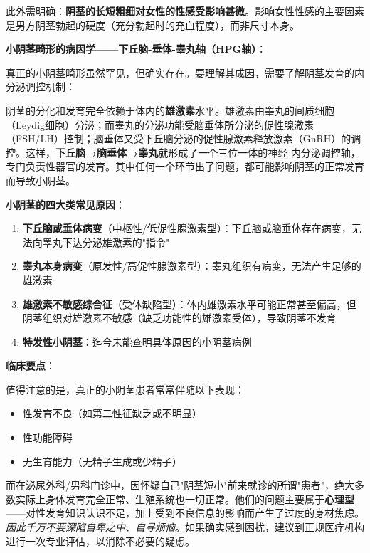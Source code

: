 此外需明确：\textbf{阴茎的长短粗细对女性的性感受影响甚微}。影响女性性感的主要因素是男方阴茎勃起的硬度（充分勃起时的充血程度），而非尺寸本身。

\vspace{0.5em}
\noindent\textbf{小阴茎畸形的病因学——下丘脑-垂体-睾丸轴（HPG轴）}：

真正的小阴茎畸形虽然罕见，但确实存在。要理解其成因，需要了解阴茎发育的内分泌调控机制：

阴茎的分化和发育完全依赖于体内的\textbf{雄激素}水平。雄激素由睾丸的间质细胞（Leydig细胞）分泌；而睾丸的分泌功能受脑垂体所分泌的促性腺激素（FSH/LH）控制；脑垂体又受下丘脑分泌的促性腺激素释放激素（GnRH）的调控。这样，\textbf{下丘脑→脑垂体→睾丸}就形成了一个三位一体的神经-内分泌调控轴，专门负责性器官的发育。其中任何一个环节出了问题，都可能影响阴茎的正常发育而导致小阴茎。

\vspace{0.5em}
\noindent\textbf{小阴茎的四大类常见原因}：

\begin{enumerate}
	\item \textbf{下丘脑或垂体病变}（中枢性/低促性腺激素型）：下丘脑或脑垂体存在病变，无法向睾丸下达分泌雄激素的"指令"
	\item \textbf{睾丸本身病变}（原发性/高促性腺激素型）：睾丸组织有病变，无法产生足够的雄激素
	\item \textbf{雄激素不敏感综合征}（受体缺陷型）：体内雄激素水平可能正常甚至偏高，但阴茎组织对雄激素不敏感（缺乏功能性的雄激素受体），导致阴茎不发育
	\item \textbf{特发性小阴茎}：迄今未能查明具体原因的小阴茎病例
\end{enumerate}

\vspace{0.5em}
\noindent\textbf{临床要点}：

值得注意的是，真正的小阴茎患者常常伴随以下表现：
\begin{itemize}
	\item 性发育不良（如第二性征缺乏或不明显）
	\item 性功能障碍
	\item 无生育能力（无精子生成或少精子）
\end{itemize}

而在泌尿外科/男科门诊中，因怀疑自己"阴茎短小"前来就诊的所谓"患者"，绝大多数实际上身体发育完全正常、生殖系统也一切正常。他们的问题主要属于\textbf{心理型}——对性发育知识认识不足，加上受到不良信息的影响而产生了过度的身材焦虑。\textit{因此千万不要深陷自卑之中、自寻烦恼}。如果确实感到困扰，建议到正规医疗机构进行一次专业评估，以消除不必要的疑虑。


